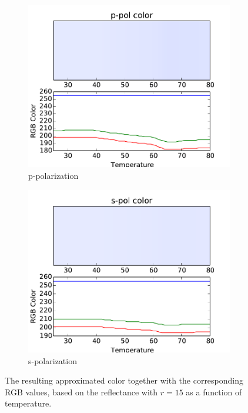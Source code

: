 %
%
\begin{figure}[h!]
    \centering
    \begin{subfigure}[b]{0.49\textwidth}
        \centering
        \includegraphics[width=\textwidth]{Results/Sim3/Rp_color.pdf}
        \caption{p-polarization}
        \label{fig:RpColor}
    \end{subfigure}
    \begin{subfigure}[b]{0.49\textwidth}
        \centering
        \includegraphics[width=\textwidth]{Results/Sim3/Rs_color.pdf}
        \caption{s-polarization}
        \label{fig:RsColor}
    \end{subfigure}
    \caption{
       The resulting approximated color together with the corresponding RGB values,
       based on the reflectance with $r = 15$ as a function of temperature.
    }
    \label{fig:RColor}
\end{figure}
%
